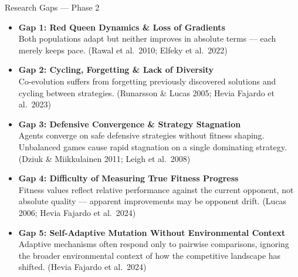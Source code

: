 \documentclass[aspectratio=169, 11pt]{beamer}
\begin{document}
\begin{frame}{Research Gaps --- Phase 2}
\scriptsize
\begin{itemize}
    \item \textbf{\textcolor{amritaMaroon}{Gap 1: Red Queen Dynamics \& Loss of Gradients}}\\
    Both populations adapt but neither improves in absolute terms --- each merely keeps pace. (Rawal et al.\ 2010; Elfeky et al.\ 2022)
    \vspace{0.15cm}
    
    \item \textbf{\textcolor{amritaMaroon}{Gap 2: Cycling, Forgetting \& Lack of Diversity}}\\
    Co-evolution suffers from forgetting previously discovered solutions and cycling between strategies. (Runarsson \& Lucas 2005; Hevia Fajardo et al.\ 2023)
    \vspace{0.15cm}
    
    \item \textbf{\textcolor{amritaMaroon}{Gap 3: Defensive Convergence \& Strategy Stagnation}}\\
    Agents converge on safe defensive strategies without fitness shaping. Unbalanced games cause rapid stagnation on a single dominating strategy. (Dziuk \& Miikkulainen 2011; Leigh et al.\ 2008)
    \vspace{0.15cm}
    
    \item \textbf{\textcolor{amritaMaroon}{Gap 4: Difficulty of Measuring True Fitness Progress}}\\
    Fitness values reflect relative performance against the current opponent, not absolute quality --- apparent improvements may be opponent drift. (Lucas 2006; Hevia Fajardo et al.\ 2024)
    \vspace{0.15cm}
    
    \item \textbf{\textcolor{amritaMaroon}{Gap 5: Self-Adaptive Mutation Without Environmental Context}}\\
    Adaptive mechanisms often respond only to pairwise comparisons, ignoring the broader environmental context of how the competitive landscape has shifted. (Hevia Fajardo et al.\ 2024)
\end{itemize}
\end{frame}



\end{document}
